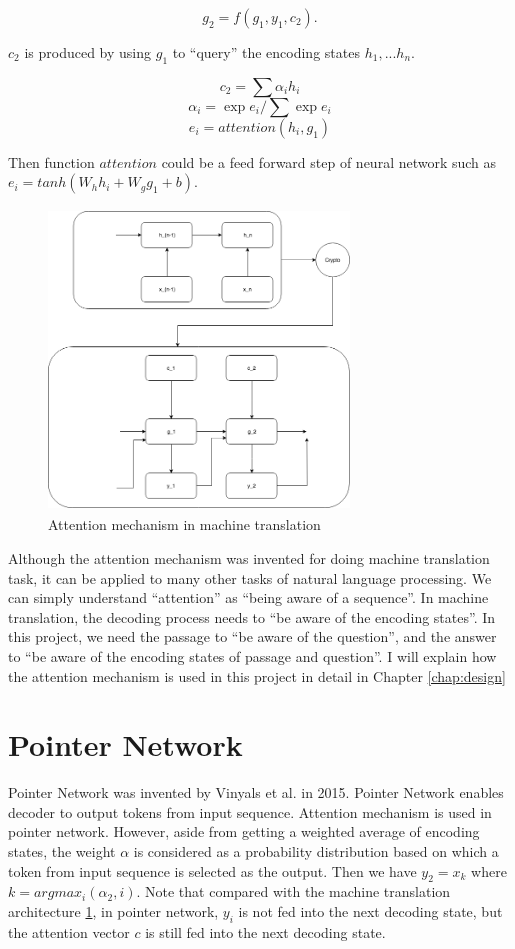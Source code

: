 \documentclass[modernstyle,12pt]{sjsuthesis}
\theoremstyle{definition}
\begin{document}
$$g_2 =f(g_{1},y_{1},c_2).$$

$c_2$ is produced by using $g_1$ to ``query'' the encoding states $h_1, ... h_n$.

$$c_2 = \sum{\alpha _i h_i}$$
$$\alpha _i = \exp{e_i} / \sum{\exp{e_i}}$$
$$e_i = attention(h_i, g_1)$$

Then function $attention$ could be a feed forward step of neural network such as $e_i = tanh(W_h h_i + W_g g_1 + b)$.


\begin{figure}[htbp]\centering
  \includegraphics[width=8cm, height=8cm]{figures/attention}
  \caption{Attention mechanism in machine translation}
  \label{f:attention}
\end{figure}




Although the attention mechanism was invented for doing machine translation task, it can be applied to many other tasks of natural language processing. We can simply understand ``attention'' as ``being aware of a sequence''. In machine translation, the decoding process needs to ``be aware of the encoding states''. In this project, we need the passage to ``be aware of the question'', and the answer to ``be aware of the encoding states of passage and question''. I will explain how the attention mechanism is used in this project in detail in Chapter \ref{chap:design}




\section{Pointer Network}\label{sect:pointerNet}

Pointer Network\cite{vinyals2015pointer} was invented by Vinyals et al. in 2015. Pointer Network enables decoder to output tokens from input sequence. Attention mechanism is used in pointer network. However, aside from getting a weighted average of encoding states, the weight $\alpha$ is considered as a probability distribution based on which a token from input sequence is selected as the output. Then we have $y_2 = x_k$ where $k = argmax_i(\alpha _2,i)$. Note that compared with the machine translation architecture \ref{f:attention}, in pointer network, $y_i$ is not fed into the next decoding state, but the attention vector $c$ is still fed into the next decoding state.
\end{document}
